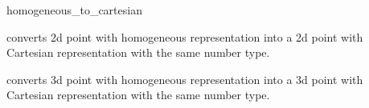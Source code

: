 \begin{ccRefFunction}{homogeneous_to_cartesian}


        {converts 2d point  with homogeneous representation  
         into a 2d point with Cartesian representation with the same
         number type.}

        {converts 3d point  with homogeneous representation  
         into a 3d point with Cartesian representation with the same
         number type.}
\end{ccRefFunction}

